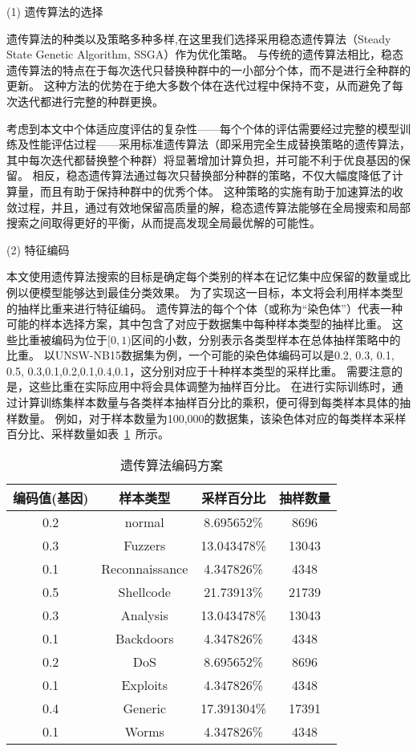 (1) 遗传算法的选择\par
遗传算法的种类以及策略多种多样,在这里我们选择采用稳态遗传算法（Steady State Genetic Algorithm, SSGA）作为优化策略。
与传统的遗传算法相比，稳态遗传算法的特点在于每次迭代只替换种群中的一小部分个体，而不是进行全种群的更新。
这种方法的优势在于绝大多数个体在迭代过程中保持不变，从而避免了每次迭代都进行完整的种群更换。\par

考虑到本文中个体适应度评估的复杂性——每个个体的评估需要经过完整的模型训练及性能评估过程——采用标准遗传算法（即采用完全生成替换策略的遗传算法，其中每次迭代都替换整个种群）将显著增加计算负担，并可能不利于优良基因的保留。
相反，稳态遗传算法通过每次只替换部分种群的策略，不仅大幅度降低了计算量，而且有助于保持种群中的优秀个体。
这种策略的实施有助于加速算法的收敛过程，并且，通过有效地保留高质量的解，稳态遗传算法能够在全局搜索和局部搜索之间取得更好的平衡，从而提高发现全局最优解的可能性。

(2) 特征编码\par
本文使用遗传算法搜索的目标是确定每个类别的样本在记忆集中应保留的数量或比例以便模型能够达到最佳分类效果。
为了实现这一目标，本文将会利用样本类型的抽样比重来进行特征编码。
遗传算法的每个个体（或称为“染色体”）代表一种可能的样本选择方案，其中包含了对应于数据集中每种样本类型的抽样比重。
这些比重被编码为位于$[0,1)$区间的小数，分别表示各类型样本在总体抽样策略中的比重。
以UNSW-NB15数据集为例，一个可能的染色体编码可以是{0.2, 0.3, 0.1, 0.5, 0.3,0.1,0.2,0.1,0.4,0.1}，这分别对应于十种样本类型的采样比重。
需要注意的是，这些比重在实际应用中将会具体调整为抽样百分比。
在进行实际训练时，通过计算训练集样本数量与各类样本抽样百分比的乘积，便可得到每类样本具体的抽样数量。
例如，对于样本数量为100,000的数据集，该染色体对应的每类样本采样百分比、采样数量如表~\ref{tab:Ga_code}~所示。\par

\begin{table}
  \caption{遗传算法编码方案}
  \label{tab:Ga_code}
  \centering
  \begin{tabular}{cccc}
    \toprule
    \textbf{编码值(基因)}&\textbf{样本类型}&\textbf{采样百分比}&\textbf{抽样数量}\\
    \midrule
    0.2&normal&8.695652\%&8696\\
    0.3&Fuzzers&13.043478\%&13043\\
    0.1&Reconnaissance&4.347826\%&4348\\
    0.5&Shellcode&21.73913\%&21739\\
    0.3&Analysis&13.043478\%&13043\\
    0.1&Backdoors&4.347826\%&4348\\
    0.2&DoS&8.695652\%&8696\\
    0.1&Exploits&4.347826\%&4348\\
    0.4&Generic&17.391304\%&17391\\
    0.1&Worms&4.347826\%&4348\\
    \bottomrule
  \end{tabular}
\end{table}

